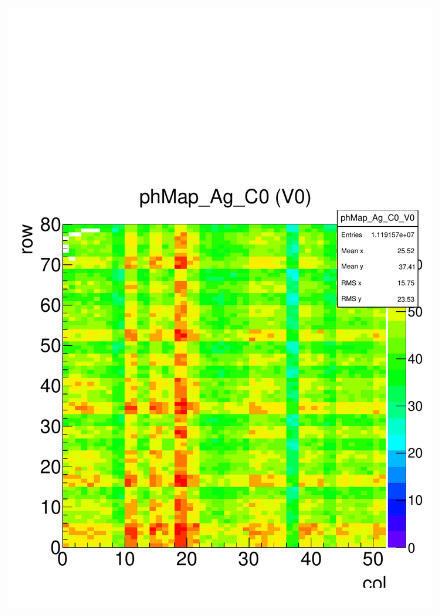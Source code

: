 \documentclass[a4paper,12pt,twoside]{article}
\begin{document}
\begin{figure} [h!]
\centering
\begin{minipage}{.48\textwidth}
  \centering
  \includegraphics[width=\textwidth]{./Figures/HRData_PHMap.pdf}
  \label{HRData-PHmap}
\end{minipage}%
\hspace{2mm}
\begin{minipage}{.48\textwidth}
  \centering

\end{minipage}
\end{figure}
\end{document}
